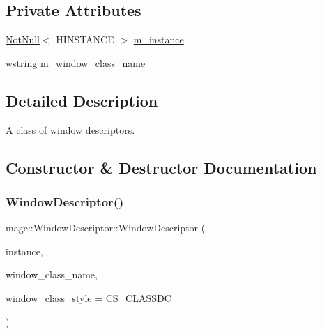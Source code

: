 \subsection*{Private Attributes}
\begin{DoxyCompactItemize}
\item 
\hyperlink{namespacemage_a8769f9d670d6b585ea306cb1062af94b}{Not\+Null}$<$ H\+I\+N\+S\+T\+A\+N\+CE $>$ \hyperlink{classmage_1_1_window_descriptor_afa7ab62493d51db5d1ab6a4167f2da4a}{m\+\_\+instance}
\item 
wstring \hyperlink{classmage_1_1_window_descriptor_abd3379a435cfea7aae78f4989635bfb5}{m\+\_\+window\+\_\+class\+\_\+name}
\end{DoxyCompactItemize}


\subsection{Detailed Description}
A class of window descriptors. 

\subsection{Constructor \& Destructor Documentation}
\hypertarget{classmage_1_1_window_descriptor_af7a5263d567d320a2edd1420293d55e7}{}\label{classmage_1_1_window_descriptor_af7a5263d567d320a2edd1420293d55e7} 
\subsubsection{\texorpdfstring{Window\+Descriptor()}{WindowDescriptor()}\hspace{0.1cm}{\footnotesize\ttfamily [1/3]}}
{\footnotesize\ttfamily mage\+::\+Window\+Descriptor\+::\+Window\+Descriptor (\begin{DoxyParamCaption}\item[{\hyperlink{namespacemage_a8769f9d670d6b585ea306cb1062af94b}{Not\+Null}$<$ H\+I\+N\+S\+T\+A\+N\+CE $>$}]{instance,  }\item[{wstring}]{window\+\_\+class\+\_\+name,  }\item[{\hyperlink{namespacemage_a41c104c036fba3756a74e19f793eeaa1}{U32}}]{window\+\_\+class\+\_\+style = {\ttfamily CS\+\_\+CLASSDC} }\end{DoxyParamCaption})\hspace{0.3cm}{\ttfamily [explicit]}}

